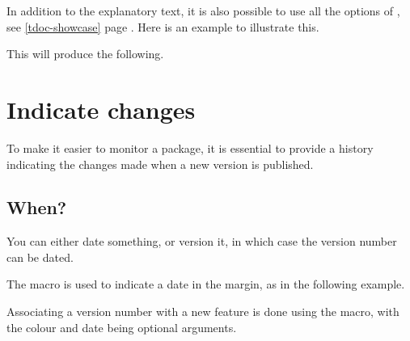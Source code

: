 

\begin{tdocexa}
    In addition to the explanatory text, it is also possible to use all the options of , see \ref{tdoc-showcase} page \pageref{tdoc-showcase}.
    Here is an example to illustrate this.

    \medskip



    \medskip

    This will produce the following.

    \medskip

    \begin{tdoc-doc-showcase}
        

    \end{tdoc-doc-showcase}
\end{tdocexa}


\section{Indicate changes}

To make it easier to monitor a package, it is essential to provide a history indicating the changes made when a new version is published.



\subsection{When?}

You can either date something, or version it, in which case the version number can be dated.




\begin{tdocexa}
    The  macro is used to indicate a date in the margin, as in the following example.


\end{tdocexa}




\begin{tdocexa}
    Associating a version number with a new feature is done using the  macro, with the colour and date being optional arguments.


\end{tdocexa}


